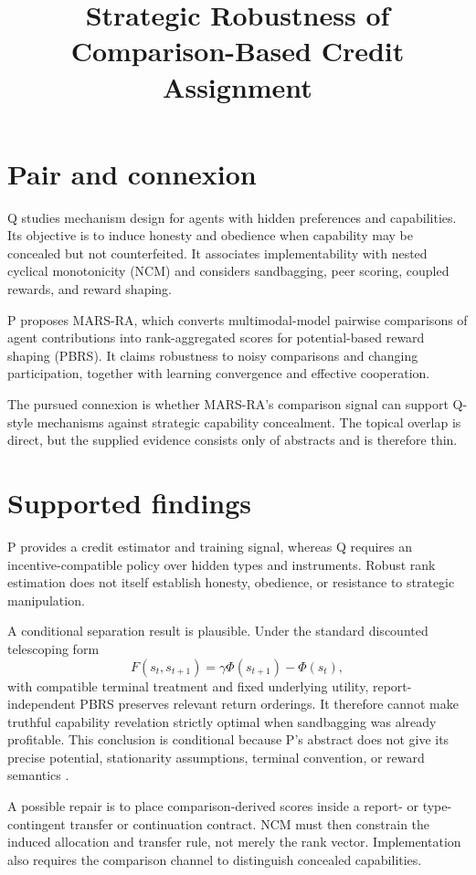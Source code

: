 \documentclass{article}
\title{Strategic Robustness of Comparison-Based Credit Assignment}
\begin{document}
\maketitle

\section{Pair and connexion}

Q studies mechanism design for agents with hidden preferences and capabilities. Its objective is to induce honesty and obedience when capability may be concealed but not counterfeited. It associates implementability with nested cyclical monotonicity (NCM) and considers sandbagging, peer scoring, coupled rewards, and reward shaping.

P proposes MARS-RA, which converts multimodal-model pairwise comparisons of agent contributions into rank-aggregated scores for potential-based reward shaping (PBRS). It claims robustness to noisy comparisons and changing participation, together with learning convergence and effective cooperation.

The pursued connexion is whether MARS-RA's comparison signal can support Q-style mechanisms against strategic capability concealment. The topical overlap is direct, but the supplied evidence consists only of abstracts and is therefore thin.

\section{Supported findings}

P provides a credit estimator and training signal, whereas Q requires an incentive-compatible policy over hidden types and instruments. Robust rank estimation does not itself establish honesty, obedience, or resistance to strategic manipulation.

A conditional separation result is plausible. Under the standard discounted telescoping form
\[
F(s_t,s_{t+1})=\gamma\Phi(s_{t+1})-\Phi(s_t),
\]
with compatible terminal treatment and fixed underlying utility, report-independent PBRS preserves relevant return orderings. It therefore cannot make truthful capability revelation strictly optimal when sandbagging was already profitable. This conclusion is conditional because P's abstract does not give its precise potential, stationarity assumptions, terminal convention, or reward semantics .

A possible repair is to place comparison-derived scores inside a report- or type-contingent transfer or continuation contract. NCM must then constrain the induced allocation and transfer rule, not merely the rank vector. Implementation also requires the comparison channel to distinguish concealed capabilities.
\end{document}
